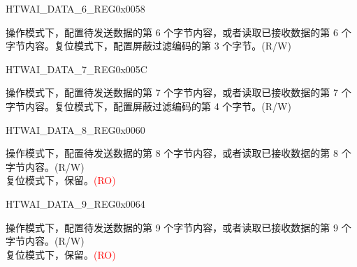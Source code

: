 \begin{register}{H}{TWAI\_DATA\_6\_REG}{0x0058}\label{regdesc:TWAIDATA6REG}
%
%
\regnewline%
\begin{regdesc}\begin{reglist}
\label{fielddesc:TWAITXDATA6}\item [TWAI\_TX\_DATA\_6] 操作模式下，配置待发送数据的第 6 个字节内容，或者读取已接收数据的第 6 个字节内容。复位模式下，配置屏蔽过滤编码的第 3 个字节。(R/W)
\end{reglist}\end{regdesc}
\end{register}


\begin{register}{H}{TWAI\_DATA\_7\_REG}{0x005C}\label{regdesc:TWAIDATA7REG}
%
%
\regnewline%
\begin{regdesc}\begin{reglist}
\label{fielddesc:TWAITXDATA7}\item [TWAI\_TX\_DATA\_7] 操作模式下，配置待发送数据的第 7 个字节内容，或者读取已接收数据的第 7 个字节内容。复位模式下，配置屏蔽过滤编码的第 4 个字节。(R/W)
\end{reglist}\end{regdesc}
\end{register}


\begin{register}{H}{TWAI\_DATA\_8\_REG}{0x0060}\label{regdesc:TWAIDATA8REG}
%
%
\regnewline%
\begin{regdesc}\begin{reglist}
\label{fielddesc:TWAITXDATA8}\item [TWAI\_TX\_DATA\_8] 操作模式下，配置待发送数据的第 8 个字节内容，或者读取已接收数据的第 8 个字节内容。(R/W)\\
复位模式下，保留。\textcolor{red}{(RO)}
\end{reglist}\end{regdesc}
\end{register}


\begin{register}{H}{TWAI\_DATA\_9\_REG}{0x0064}\label{regdesc:TWAIDATA9REG}
%
%
\regnewline%
\begin{regdesc}\begin{reglist}
\label{fielddesc:TWAITXDATA9}\item [TWAI\_TX\_DATA\_9] 操作模式下，配置待发送数据的第 9 个字节内容，或者读取已接收数据的第 9 个字节内容。(R/W)\\
复位模式下，保留。\textcolor{red}{(RO)}
\end{reglist}\end{regdesc}
\end{register}


